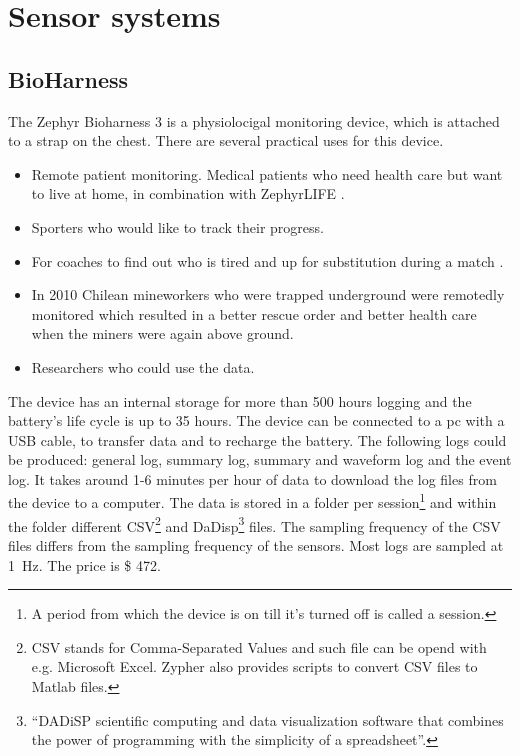 \section{Sensor systems}
	\label{sec:sensorsystems}
	\subsection{BioHarness}
			The Zephyr Bioharness 3\cite{bioharness} is a physiolocigal monitoring device, which is attached to a strap on the chest. There are several practical uses for this device.
			\begin{itemize}
				\item Remote patient monitoring. Medical patients who need health care but want to live at home, in combination with ZephyrLIFE \texttrademark \cite{bhpatients}.
				\item Sporters who would like to track their progress.
				\item For coaches to find out who is tired and up for substitution during a match \cite{bhsport}.
				\item In 2010 Chilean mineworkers who were trapped underground were remotedly monitored which resulted in a better rescue order and better health care when the miners were again above ground. \cite{chile}
				\item Researchers who could use the data.
			\end{itemize}

			The device has an internal storage for more than 500 hours logging and the battery's life cycle is up to 35 hours. The device can be connected to a pc with a USB cable, to transfer data and to recharge the battery. The following logs could be produced: general log, summary log, summary and waveform log and the event log. 
			It takes around 1-6 minutes per hour of data to download the log files from the device to a computer. \cite{bhdatasheet} The data is stored in a folder per session\footnote{A period from which the device is on till it's turned off is called a session.} and within the folder different CSV\footnote{CSV stands for Comma-Separated Values and such file can be opend with e.g. Microsoft Excel. Zypher also provides scripts to convert CSV files to Matlab files.} and DaDisp\footnote{``DADiSP scientific computing and data visualization software that combines the power of programming with the simplicity of a spreadsheet''\cite{dadisp}.} files. The sampling frequency of the CSV files differs from the sampling frequency of the sensors. Most logs are sampled at \SI{1}{\hertz}.
			The price is \$ 472.
		
